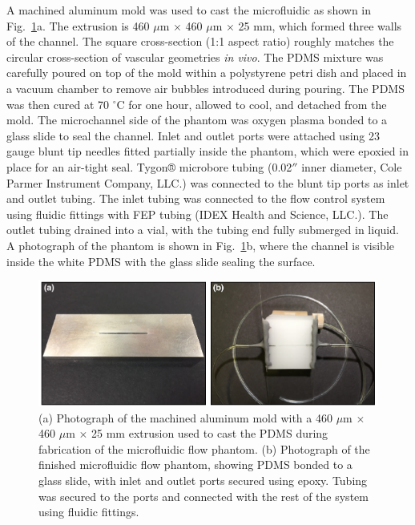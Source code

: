 \documentclass[12pt]{spieman}
\begin{document}
\begin{spacing}{2}
A machined aluminum mold was used to cast the microfluidic as shown in Fig.~\ref{fig:microfluidic}a. The extrusion is 460 $\mu$m $\times$ 460 $\mu$m $\times$ 25 mm, which formed three walls of the channel. The square cross-section (1:1 aspect ratio) roughly matches the circular cross-section of vascular geometries \textit{in vivo}. The PDMS  mixture was carefully poured on top of the mold within a polystyrene petri dish and placed in a vacuum chamber to remove air bubbles introduced during pouring. The PDMS was then cured at 70 $^\circ$C for one hour, allowed to cool, and detached from the mold. The microchannel side of the phantom was oxygen plasma bonded to a glass slide to seal the channel. Inlet and outlet ports were attached using 23 gauge blunt tip needles fitted partially inside the phantom, which were epoxied in place for an air-tight seal. Tygon® microbore tubing (0.02$''$ inner diameter, Cole Parmer Instrument Company, LLC.) was connected to the blunt tip ports as inlet and outlet tubing. The inlet tubing was connected to the flow control system using fluidic fittings with FEP tubing (IDEX Health and Science, LLC.). The outlet tubing drained into a vial, with the tubing end fully submerged in liquid. A photograph of the phantom is shown in Fig.~\ref{fig:microfluidic}b, where the channel is visible inside the white PDMS with the glass slide sealing the surface.

\begin{figure}
    \includegraphics[width=\textwidth]{Figure1.pdf}
    \caption {
        (a) Photograph of the machined aluminum mold with a 460 $\mu$m $\times$ 460 $\mu$m $\times$ 25 mm extrusion used to cast the PDMS during fabrication of the microfluidic flow phantom. (b) Photograph of the finished microfluidic flow phantom, showing PDMS bonded to a glass slide, with inlet and outlet ports secured using epoxy. Tubing was secured to the ports and connected with the rest of the system using fluidic fittings.
    }
    \label{fig:microfluidic}
\end{figure}


\end{spacing}
\end{document}
